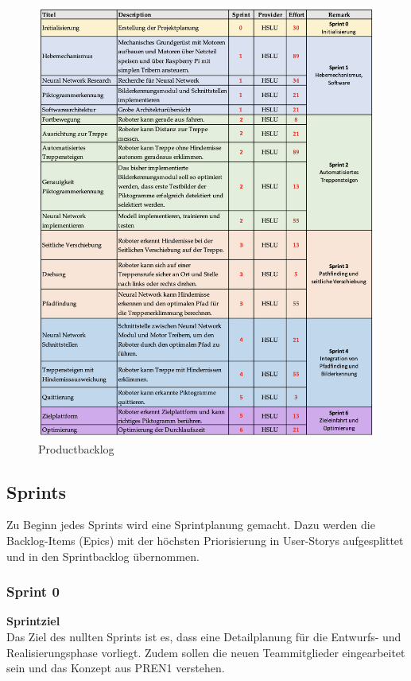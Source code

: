 \begin{figure}[H]
  \includegraphics[width=1\textwidth]{img/projektmanagement/ProductBacklog PREN2.png}
  \centering
  \caption{Productbacklog}
  \label{fig:productbacklog}
\end{figure}


\subsection{Sprints}
Zu Beginn jedes Sprints wird eine Sprintplanung gemacht. Dazu werden die Backlog-Items (Epics) mit der höchsten Priorisierung in User-Storys aufgesplittet und in den Sprintbacklog übernommen. 

\subsubsection{Sprint 0}
\textbf{Sprintziel}\\
Das Ziel des nullten Sprints ist es, dass eine Detailplanung für die Entwurfs- und Realisierungsphase vorliegt. Zudem sollen die neuen Teammitglieder eingearbeitet sein und das Konzept aus PREN1 verstehen. 

